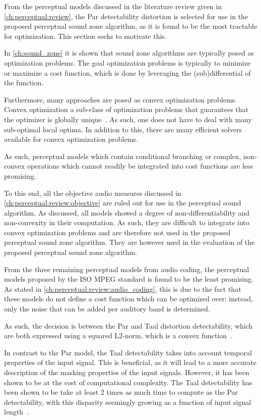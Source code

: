 From the perceptual models discussed in the literature review given in \autoref{ch:perceptual:review},
the Par detectability distortion is selected for use in the proposed perceptual sound zone algorithm, as it 
is found to be the most tractable for optimization.
This section seeks to motivate this.

In \autoref{ch:sound_zone} it is shown that sound zone algorithms are typically posed as optimization problems. 
The goal optimization problems is typically to minimize or maximize a cost function, 
which is done by leveraging the (sub)differential of the function.

Furthermore, many approaches are posed as convex optimization problems.
Convex optimization a sub-class of optimization problems that guarantees that the optimizer is 
globally unique~\cite{boyd2004convex}. 
As such, one does not have to deal with many sub-optimal local optima. 
In addition to this, there are many efficient solvers available for convex optimization problems.

As such, perceptual models which contain conditional branching or complex, non-convex operations which cannot readily 
be integrated into cost functions are less promising.

To this end, all the objective audio measures discussed in \autoref{ch:perceptual:review:objective} 
are ruled out for use in the perceptual sound algorithm. 
As discussed, all models showed a degree of non-differentiability and non-convexity in their computation.
As such, they are difficult to integrate into convex optimization problems and are therefore not used in the proposed 
perceptual sound zone algorithm.
They are however used in the evaluation of the proposed perceptual sound zone algorithm.

From the three remaining perceptual models from audio coding, 
the perceptual models proposed by the ISO MPEG standard is found to be the least promising.
As stated in \autoref{ch:perceptual:review:audio_coding}, this is due to the fact that these models do not define a cost function which can be optimized over:
instead, only the noise that can be added per auditory band is determined.

As such, the decision is between the Par and Taal distortion detectability, which are both expressed using a  
squared L2-norm, which is a convex function~\cite{boyd2004convex}.

In contrast to the Par model, the Taal detectability takes into account temporal properties of the input signal.
This is beneficial, as it will lead to a more accurate description of the masking properties of the input signals.
However, it has been shown to be at the cost of computational complexity.
The Taal detectability has been shown to be take at least 2 times as much time to compute as the 
Par detectability, with this disparity seemingly growing as a function of input signal length~\cite{taal2012low}.

